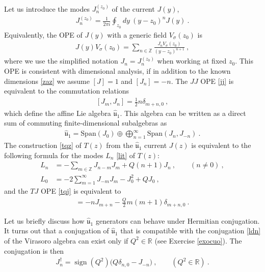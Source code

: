 \documentclass[12pt, a4paper, notitlepage, twoside]{report}
\numberwithin{equation}{section}
\theoremstyle{break}
\begin{document}
Let us introduce the modes $J_n^{(z_0)}$ of the current $J(y)$, 
\begin{align}
 J_n^{(z_0)} = \frac{1}{2\pi i}\oint_{z_0} dy\ (y-z_0)^n J(y)\ .
\end{align}
Equivalently, the OPE of $J(y)$ with a generic field $V_\sigma(z_0)$ is 
\begin{align}
 \boxed{J(y) V_\sigma(z_0) = \sum_{n\in {\mathbb{Z}}} \frac{J_n V_\sigma(z_0)}{(y-z_0)^{n+1}}}\ ,
\label{jvn}
\end{align}
where we use the simplified notation $J_n=J_n^{(z_0)}$ when working at fixed $z_0$.
This OPE is consistent with dimensional analysis, if in addition to the known dimensions \eqref{zaz} we assume $[J]=1$ and $[J_n]=-n$.
The $JJ$ OPE \eqref{jj} is equivalent to the commutation relations
\begin{align}
 \boxed{ [J_m,J_n] =  \frac12 n \delta_{m+n,0}}\ ,
\label{jmjn}
\end{align}
which define the affine Lie algebra \textbf{\boldmath $\hat{\mathfrak{u}}_1$}.
This algebra can be written as a direct sum of commuting finite-dimensional subalgebras as 
\begin{align}
 \hat{\mathfrak{u}}_1 = \text{Span}(J_0) \oplus \bigoplus_{n=1}^\infty \text{Span}(J_n,J_{-n}) \ .
\end{align}
The construction \eqref{tqz} of $T(z)$ from the $\hat{\mathfrak{u}}_1$ current $J(z)$ is equivalent to the following formula for the modes $L_n$ \eqref{lit} of $T(z)$:
\begin{align}
 L_n &= -\sum_{m\in{\mathbb{Z}}} J_{n-m}J_m + Q(n+1)J_n\ , \qquad (n\neq 0)\ ,
\label{lnj}
\\
L_0 &=-2\sum_{m=1}^\infty J_{-m}J_m -J_0^2+QJ_0 \ ,
\label{lzj}
\end{align}
and the $TJ$ OPE \eqref{tqj} is equivalent to 
\begin{align}
 [L_m,J_n] = -nJ_{m+n} -\frac{Q}{2}m(m+1) \delta_{m+n,0} \ . 
\end{align}

Let us briefly discuss how $\hat{\mathfrak{u}}_1$ generators can behave under Hermitian conjugation.
It turns out that a conjugation of $\hat{\mathfrak{u}}_1$ that is compatible with the conjugation \eqref{ldn} of the Virasoro algebra  can exist only if $Q^2\in\mathbb{R}$ (see Exercise \ref{exocuo}). 
The conjugation is then 
\begin{align}
 J_n^\dagger = \operatorname{sign}(Q^2)\big( Q\delta_{n,0}-J_{-n} \big)\ ,\qquad (Q^2\in\mathbb{R}) \ .
\label{jdq}
\end{align}
\end{document}
